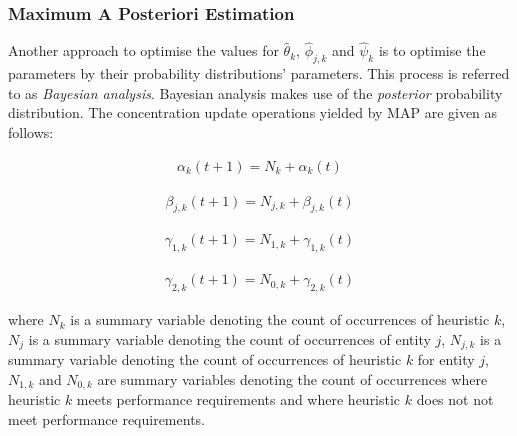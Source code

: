 \documentclass[preprint,review,12pt]{elsarticle}
\begin{document}
\subsubsection{Maximum A Posteriori Estimation}\label{sec:bhh:optimisation_step:map}

Another approach to optimise the values for $\hat{\theta}_{k}$, $\hat{\phi}_{j,k}$ and $\hat{\psi}_{k}$ is to optimise the parameters by their probability distributions' parameters. This process is referred to as \textit{Bayesian analysis}. Bayesian analysis makes use of the \textit{posterior} probability distribution. The concentration update operations yielded by \acs{MAP} are given as follows:

\begin{equation}
	\label{eq:bhh:optimisation_step:map:alpha_update_operation}
	\begin{split}
		\alpha_{k}(t+1) = N_{k} + \alpha_{k}(t)
	\end{split}
\end{equation}

\begin{equation}
	\label{eq:bhh:optimisation_step:map:beta_update_operation}
	\begin{split}
		\beta_{j,k}(t+1) = N_{j,k} + \beta_{j,k}(t)
	\end{split}
\end{equation}

\begin{equation}
	\label{eq:bhh:optimisation_step:map:gamma1_update_operation}
	\begin{split}
		\gamma_{1,k}(t+1) = N_{1,k} + \gamma_{1,k}(t)
	\end{split}
\end{equation}

\begin{equation}
	\label{eq:bhh:optimisation_step:map:gamma2_update_operation}
	\begin{split}
		\gamma_{2,k}(t+1) = N_{0,k} + \gamma_{2,k}(t)
	\end{split}
\end{equation}

\noindent
where $N_{k}$ is a summary variable denoting the count of occurrences of heuristic $k$, $N_{j}$ is a summary variable denoting the count of occurrences of entity $j$, $N_{j,k}$ is a summary variable denoting the count of occurrences of heuristic $k$ for entity $j$, $N_{1,k}$ and $N_{0,k}$ are summary variables denoting the count of occurrences where heuristic $k$ meets performance requirements and where heuristic $k$ does not not meet performance requirements.
\end{document}
